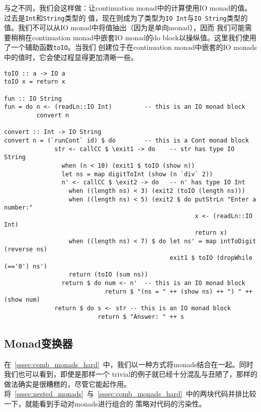 \indent{}与之不同，我们会这样做：让continuation monad中的计算使用IO monad的值。过去是\texttt{Int}和\texttt{String}类型的
值，现在则成为了类型为\texttt{IO Int}与\texttt{IO String}类型的值。我们不可以从IO monad中将值抽出（因为是单向monad），因而
我们可能需要稍稍在continuation monad中嵌套IO monad的do block以操纵值。这里我们使用了一个辅助函数\texttt{toIO}。当我们
创建位于在continuation monad中嵌套的IO monads中的值时，它会使过程显得更加清晰一些。
\begin{verbatim}
toIO :: a -> IO a
toIO x = return x

fun :: IO String
fun = do n <- (readLn::IO Int)         -- this is an IO monad block
         convert n

convert :: Int -> IO String
convert n = (`runCont` id) $ do        -- this is a Cont monad block
              str <- callCC $ \exit1 -> do    -- str has type IO String
                when (n < 10) (exit1 $ toIO (show n))
                let ns = map digitToInt (show (n `div` 2))
                n' <- callCC $ \exit2 -> do   -- n' has type IO Int
                  when ((length ns) < 3) (exit2 (toIO (length ns)))
                  when ((length ns) < 5) (exit2 $ do putStrLn "Enter a number:"
                                                     x <- (readLn::IO Int)
                                                     return x)
                  when ((length ns) < 7) $ do let ns' = map intToDigit (reverse ns)
                                              exit1 $ toIO (dropWhile (=='0') ns')
                  return (toIO (sum ns))
                return $ do num <- n'  -- this is an IO monad block
                            return $ "(ns = " ++ (show ns) ++ ") " ++ (show num)
              return $ do s <- str -- this is an IO monad block
                          return $ "Answer: " ++ s
\end{verbatim}

\subsection{Monad变换器}
\indent{}在~\ref{sssec:comb_monads_hard}~中，我们以一种方式将monads结合在一起。同时我们也可以看到，即使是那样一个
trivial的例子就已经十分混乱与丑陋了，那样的做法确实是很糟糕的，尽管它能起作用。
将~\ref{sssec:nested_monads}~与~\ref{sssec:comb_monads_hard}~中的两块代码并排比较一下，就能看到手动对monads进行组合的
策略对代码的污染性。

